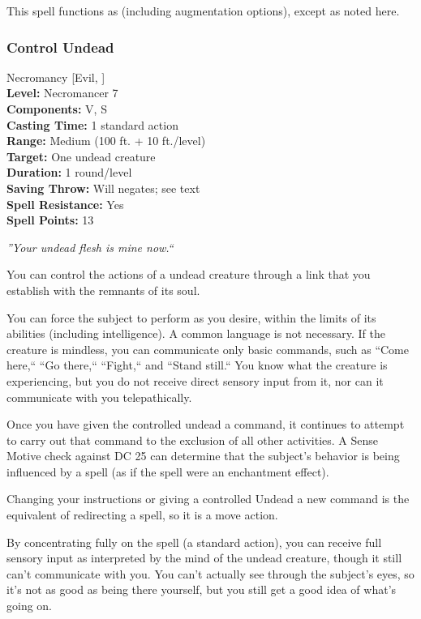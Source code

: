This spell functions as  (including augmentation options), except as noted here.
\subsubsection{Control Undead}
\label{Spell:ControlUndead}
Necromancy [Evil, ]
\\ \textbf{Level:} Necromancer 7
\\ \textbf{Components:} V, S
\\ \textbf{Casting Time:} 1 standard action
\\ \textbf{Range:} Medium (100 ft. + 10 ft./level)
\\ \textbf{Target:} One undead creature
\\ \textbf{Duration:} 1 round/level
\\ \textbf{Saving Throw:} Will negates; see text
\\ \textbf{Spell Resistance:} Yes
\\ \textbf{Spell Points:} 13

\emph{''Your undead flesh is mine now.``}

You can control the actions of a undead creature through a link that you establish with the remnants of its soul.

You can force the subject to perform as you desire, within the limits of its abilities (including intelligence).
A common language is not necessary.
If the creature is mindless, you can communicate only basic commands, such as ``Come here,`` ``Go there,`` ``Fight,`` and ``Stand still.`` 
You know what the creature is experiencing, but you do not receive direct sensory input from it, nor can it communicate with you telepathically.

Once you have given the controlled undead a command, 
it continues to attempt to carry out that command to the exclusion of all other activities. 
A Sense Motive check against DC 25 can determine that the subject's behavior is being influenced by a spell (as if the spell were an enchantment effect).

Changing your instructions or giving a controlled Undead a new command is the equivalent of redirecting a spell, so it is a move action.

By concentrating fully on the spell (a standard action), 
you can receive full sensory input as interpreted by the mind of the undead creature, though it still can't communicate with you. 
You can't actually see through the subject's eyes, so it's not as good as being there yourself, but you still get a good idea of what's going on.

